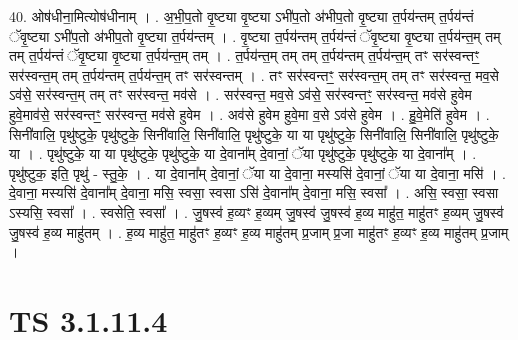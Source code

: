 \documentclass[17pt]{extarticle}
\begin{document}
40. ओष॑धीना॒मित्योष॑धीनाम् । . अ॒भी॒प॒तो वृ॒ष्ट्या वृ॒ष्ट्या ऽभी॑प॒तो अ॑भीप॒तो वृ॒ष्ट्या त॒र्पय॑न्तम् त॒र्पय॑न्तं 
ॅवृ॒ष्ट्या ऽभी॑प॒तो अ॑भीप॒तो वृ॒ष्ट्या त॒र्पय॑न्तम् । . वृ॒ष्ट्या त॒र्पय॑न्तम् त॒र्पय॑न्तं ॅवृ॒ष्ट्या वृ॒ष्ट्या त॒र्पय॑न्त॒म् तम् तम् त॒र्पय॑न्तं ॅवृ॒ष्ट्या वृ॒ष्ट्या त॒र्पय॑न्त॒म् तम् । . त॒र्पय॑न्त॒म् तम् तम् त॒र्पय॑न्तम् त॒र्पय॑न्त॒म् तꣳ सर॑स्वन्तꣳ॒॒ सर॑स्वन्त॒म् तम् त॒र्पय॑न्तम् त॒र्पय॑न्त॒म् तꣳ सर॑स्वन्तम् । . तꣳ सर॑स्वन्तꣳ॒॒ सर॑स्वन्त॒म् तम् तꣳ सर॑स्वन्त॒ मव॒से ऽव॑से॒ सर॑स्वन्त॒म् तम् तꣳ सर॑स्वन्त॒ मव॑से । . सर॑स्वन्त॒ मव॒से ऽव॑से॒ सर॑स्वन्तꣳ॒॒ सर॑स्वन्त॒ मव॑से हुवेम हुवे॒माव॑से॒ सर॑स्वन्तꣳ॒॒ सर॑स्वन्त॒ मव॑से हुवेम । . अव॑से हुवेम हुवे॒मा व॒से ऽव॑से हुवेम । . हु॒वे॒मेति॑ हुवेम । . सिनी॑वालि॒ पृथु॑ष्टुके॒ पृथु॑ष्टुके॒ सिनी॑वालि॒ सिनी॑वालि॒ पृथु॑ष्टुके॒ या या पृथु॑ष्टुके॒ सिनी॑वालि॒ सिनी॑वालि॒ पृथु॑ष्टुके॒ या । . पृथु॑ष्टुके॒ या या पृथु॑ष्टुके॒ पृथु॑ष्टुके॒ या दे॒वाना᳚म् दे॒वानां॒ ॅया पृथु॑ष्टुके॒ पृथु॑ष्टुके॒ या दे॒वाना᳚म् । . पृथु॑ष्टुक॒ इति॒ पृथु॑ - स्तु॒के॒ । . या दे॒वाना᳚म् दे॒वानां॒ ॅया या दे॒वाना॒ मस्यसि॑ दे॒वानां॒ ॅया या दे॒वाना॒ मसि॑ । . दे॒वाना॒ मस्यसि॑ दे॒वाना᳚म् दे॒वाना॒ मसि॒ स्वसा॒ स्वसा ऽसि॑ दे॒वाना᳚म् दे॒वाना॒ मसि॒ स्वसा᳚ । . असि॒ स्वसा॒ स्वसा ऽस्यसि॒ स्वसा᳚ । . स्वसेति॒ स्वसा᳚ । . जु॒षस्व॑ ह॒व्यꣳ ह॒व्यम् जु॒षस्व॑ जु॒षस्व॑ ह॒व्य माहु॑त॒ माहु॑तꣳ ह॒व्यम् जु॒षस्व॑ जु॒षस्व॑ ह॒व्य माहु॑तम् । . ह॒व्य माहु॑त॒ माहु॑तꣳ ह॒व्यꣳ ह॒व्य माहु॑तम् प्र॒जाम् प्र॒जा माहु॑तꣳ ह॒व्यꣳ ह॒व्य माहु॑तम् प्र॒जाम् । \newline
\pagebreak
{}

\section{ TS 3.1.11.4 }
\end{document}
